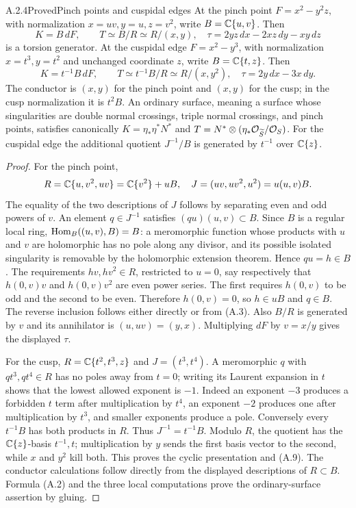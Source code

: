 \begin{statement}{A.2.4}{Proved}{Pinch points and cuspidal edges}
At the pinch point $F=x^2-y^2z$, with normalization $x=uv,y=u,z=v^2$, write $B=\mathbb C\{u,v\}$. Then
\[
 K=B\,dF,\qquad T\simeq B/R\simeq R/(x,y),
\quad \tau=2yz\,dx-2xz\,dy-xy\,dz
\tag{A.8}
\]
is a torsion generator. At the cuspidal edge $F=x^2-y^3$, with normalization $x=t^3,y=t^2$ and unchanged coordinate $z$, write $B=\mathbb C\{t,z\}$. Then
\[
 K=t^{-1}B\,dF,\qquad
 T\simeq t^{-1}B/R\simeq R/(x,y^2),
 \quad\tau=2y\,dx-3x\,dy.
\tag{A.9}
\]
The conductor is $(x,y)$ for the pinch point and $(x,y)$ for the cusp; in the cusp normalization it is $t^2B$. An ordinary surface, meaning a surface whose singularities are double normal crossings, triple normal crossings, and pinch points, satisfies canonically $K=\eta_*\eta^*N^*$ and $T=N^*\otimes(\eta_*\mathcal O_{\widetilde S}/\mathcal O_S)$. For the cuspidal edge the additional quotient $J^{-1}/B$ is generated by $t^{-1}$ over $\mathbb C\{z\}$.
\end{statement}
\begin{proof}
For the pinch point,
\[
 R=\mathbb C\{u,v^2,uv\}=\mathbb C\{v^2\}+uB,
 \quad J=(uv,uv^2,u^2)=u(u,v)B.
\]
The equality of the two descriptions of $J$ follows by separating even and odd powers of $v$. An element $q\in J^{-1}$ satisfies $(qu)(u,v)\subset B$. Since $B$ is a regular local ring, $\operatorname{Hom}_B((u,v),B)=B$: a meromorphic function whose products with $u$ and $v$ are holomorphic has no pole along any divisor, and its possible isolated singularity is removable by the holomorphic extension theorem. Hence $qu=h\in B$. The requirements $hv,hv^2\in R$, restricted to $u=0$, say respectively that $h(0,v)v$ and $h(0,v)v^2$ are even power series. The first requires $h(0,v)$ to be odd and the second to be even. Therefore $h(0,v)=0$, so $h\in uB$ and $q\in B$. The reverse inclusion follows either directly or from (A.3). Also $B/R$ is generated by $v$ and its annihilator is $(u,uv)=(y,x)$. Multiplying $dF$ by $v=x/y$ gives the displayed $\tau$.

For the cusp, $R=\mathbb C\{t^2,t^3,z\}$ and $J=(t^3,t^4)$. A meromorphic $q$ with $qt^3,qt^4\in R$ has no poles away from $t=0$; writing its Laurent expansion in $t$ shows that the lowest allowed exponent is $-1$. Indeed an exponent $-3$ produces a forbidden $t$ term after multiplication by $t^4$, an exponent $-2$ produces one after multiplication by $t^3$, and smaller exponents produce a pole. Conversely every $t^{-1}B$ has both products in $R$. Thus $J^{-1}=t^{-1}B$. Modulo $R$, the quotient has the $\mathbb C\{z\}$-basis $t^{-1},t$; multiplication by $y$ sends the first basis vector to the second, while $x$ and $y^2$ kill both. This proves the cyclic presentation and (A.9). The conductor calculations follow directly from the displayed descriptions of $R\subset B$. Formula (A.2) and the three local computations prove the ordinary-surface assertion by gluing.
\end{proof}


